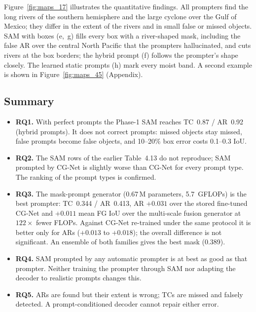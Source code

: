 Figure~\ref{fig:maps_17} illustrates the quantitative findings. All prompters find the long rivers of the southern
hemisphere and the large cyclone over the Gulf of Mexico; they differ in the extent of the rivers and in small false or
missed objects. SAM with boxes (e,~g) fills every box with a river-shaped mask, including the false AR over the central
North Pacific that the prompters hallucinated, and cuts rivers at the box borders; the hybrid prompt (f) follows the
prompter's shape closely. The learned static prompts (h) mark every moist band. A second example is shown in
Figure~\ref{fig:maps_45} (Appendix).

\subsection{Summary}
\label{sec:auto_prompt_summary}

\begin{itemize}
  \item \textbf{RQ1.} With perfect prompts the Phase-1 SAM reaches TC~0.87 / AR~0.92 (hybrid prompts). It does not
  correct prompts: missed objects stay missed, false prompts become false objects, and 10--20\% box error costs
  0.1--0.3 IoU.
  \item \textbf{RQ2.} The SAM rows of the earlier Table~4.13 do not reproduce; SAM prompted by CG-Net is slightly worse
  than CG-Net for every prompt type. The ranking of the prompt types is confirmed.
  \item \textbf{RQ3.} The mask-prompt generator (0.67\,M parameters, 5.7~GFLOPs) is the best prompter: TC~0.344 /
  AR~0.413, AR $+0.031$ over the stored fine-tuned CG-Net and $+0.011$ mean FG IoU over the multi-scale fusion
  generator at $122\times$ fewer FLOPs. Against CG-Net re-trained under the same protocol it is better only for ARs
  ($+0.013$ to $+0.018$); the overall difference is not significant. An ensemble of both families gives the best mask
  (0.389).
  \item \textbf{RQ4.} SAM prompted by any automatic prompter is at best as good as that prompter. Neither training the
  prompter through SAM nor adapting the decoder to realistic prompts changes this.
  \item \textbf{RQ5.} ARs are found but their extent is wrong; TCs are missed and falsely detected. A prompt-conditioned
  decoder cannot repair either error.
\end{itemize}

